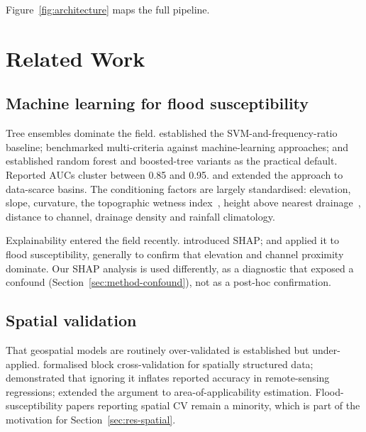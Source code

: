 \documentclass[11pt,a4paper]{article}
\begin{document}
Figure~\ref{fig:architecture} maps the full pipeline.

\section{Related Work}
\label{sec:related}

\subsection{Machine learning for flood susceptibility}
Tree ensembles dominate the field. \citet{tehrany2014} established the
SVM-and-frequency-ratio baseline; \citet{khosravi2018} benchmarked multi-criteria
against machine-learning approaches; \citet{arabameri2019} and \citet{saha2021}
established random forest and boosted-tree variants as the practical default.
Reported AUCs cluster between 0.85 and 0.95. \citet{wang2020} and
\citet{avand2021} extended the approach to data-scarce basins.
The conditioning factors are largely standardised: elevation, slope, curvature,
the topographic wetness index~\citep{beven1979}, height above nearest
drainage~\citep{renno2008,nobre2011}, distance to channel, drainage density and
rainfall climatology.

Explainability entered the field recently. \citet{lundberg2017} introduced SHAP;
\citet{aydin2022} and \citet{seydi2023} applied it to flood susceptibility,
generally to confirm that elevation and channel proximity dominate. Our SHAP
analysis is used differently, as a diagnostic that exposed a confound
(Section~\ref{sec:method-confound}), not as a post-hoc confirmation.

\subsection{Spatial validation}
That geospatial models are routinely over-validated is established but
under-applied. \citet{roberts2017} formalised block cross-validation for
spatially structured data; \citet{ploton2020} demonstrated that ignoring it
inflates reported accuracy in remote-sensing regressions; \citet{meyer2021}
extended the argument to area-of-applicability estimation. Flood-susceptibility
papers reporting spatial CV remain a minority, which is part of the motivation
for Section~\ref{sec:res-spatial}.
\end{document}
